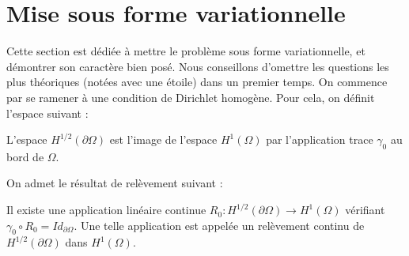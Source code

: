 \documentclass[11pt,a4paper]{article}
\begin{document}
\section{Mise sous forme variationnelle}

Cette section est dédiée à mettre le problème sous forme variationnelle, et démontrer son caractère  bien posé. Nous conseillons d'omettre les questions les plus théoriques (notées avec une étoile) dans un premier temps. 
On commence par se ramener à une condition de Dirichlet homogène. Pour cela, on définit l'espace suivant : \\


\begin{Def} L'espace $H^{1/2}(\partial\Omega)$ est l'image de l'espace $H^1(\Omega)$ par l'application trace $\gamma_0$ au bord de $\Omega$. 
\end{Def}
On admet le résultat de relèvement suivant :
\begin{The}
Il existe une application linéaire continue $R_0 : H^{1/2}(\partial \Omega) \to H^1(\Omega)$  vérifiant $\gamma_0 \circ R_0 = Id_{\partial \Omega}$. Une telle application est appelée un relèvement continu de $H^{1/2}(\partial \Omega)$ dans $H^1(\Omega)$. 
\end{The}


\end{document}
